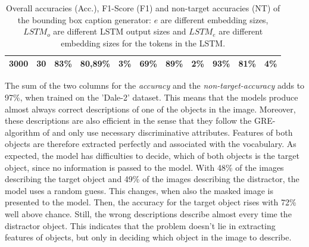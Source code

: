 \begin{table}[ht]
\begin{tabular}{cc|ccc|ccc|ccc}
        {3000}   & {30}     & {83\%}                              & {80,89\%}                           & {3\%}                                    & {69\%}        & {89\%}      & {2\%}       & {93\%}        & {81\%}      & {4\%}       \\
        \bottomrule
    \end{tabular}
    \caption{Overall accuracies (Acc.), F1-Score (F1) and non-target accuracies (NT) of the bounding box caption generator: $e$ are different embedding sizes, $LSTM_o$ are different LSTM output sizes and $LSTM_e$ are different embedding sizes for the tokens in the LSTM.}
    \label{tab:results_masked-caption-generator}
\end{table}

The sum of the two columns for the \emph{accuracy} and the \emph{non-target-accuracy} adds to 97\%, when trained on the 'Dale-2' dataset.
This means that the models produce almost always correct descriptions of one of the objects in the image.
Moreover, these descriptions are also efficient in the sense that they follow the GRE-algorithm of \citet{Dale1995} and only use necessary discriminative attributes.
Features of both objects are therefore extracted perfectly and associated with the vocabulary.
As expected, the model has difficulties to decide, which of both objects is the target object, since no information is passed to the model.
With 48\% of the images describing the target object and 49\% of the images describing the distractor, the model uses a random guess.
This changes, when also the masked image is presented to the model.
Then, the accuracy for the target object rises with 72\% well above chance.
Still, the wrong descriptions describe almost every time the distractor object.
This indicates that the problem doesn't lie in extracting features of objects, but only in deciding which object in the image to describe.

